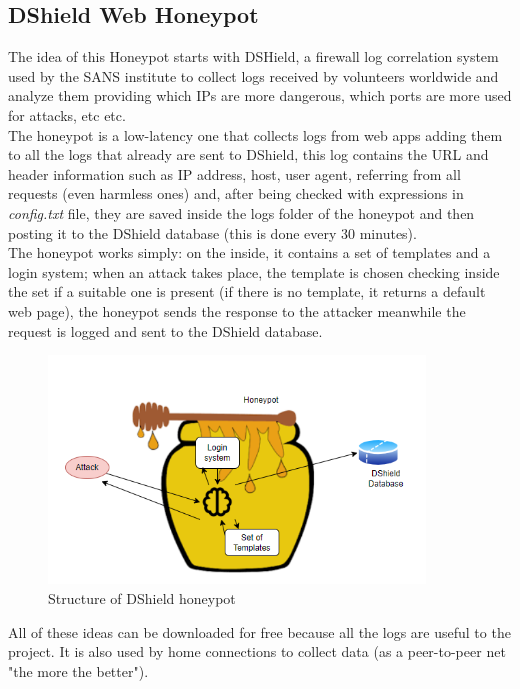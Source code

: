 \subsection{DShield Web Honeypot}
The idea of this Honeypot starts with DSHield, a firewall log correlation system used by the SANS institute to collect logs received by volunteers worldwide and analyze them providing which IPs are more dangerous, which ports are more used for attacks, etc etc.\\
The honeypot is a low-latency one that collects logs from web apps adding them to all the logs that already are sent to DShield, this log contains the URL and header information such as IP address, host, user agent, referring from all requests (even harmless ones) and, after being checked with expressions in \textit{config.txt} file, they are saved inside the logs folder of the honeypot and then posting it to the DShield database (this is done every 30 minutes).\\
The honeypot works simply: on the inside, it contains a set of templates and a login system; when an attack takes place, the template is chosen checking inside the set if a suitable one is present (if there is no template, it returns a default web page), the honeypot sends the response to the attacker meanwhile the request is logged and sent to the DShield database.

\begin{figure}[h!]
\centering
\includegraphics[width=10cm]{images/DSHoneypot.png}
\caption{Structure of DShield honeypot}
\label{fig:irradiances}
\end{figure}
\FloatBarrier


All of these ideas can be downloaded for free because all the logs are useful to the project. It is also used by home connections to collect data (as a peer-to-peer net "the more the better").

